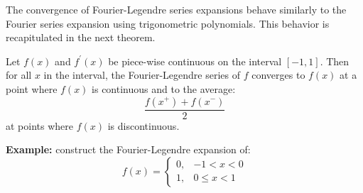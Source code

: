 The convergence of Fourier-Legendre series expansions behave similarly to the Fourier series expansion using trigonometric polynomials.  This behavior is recapitulated in the next theorem. 

\begin{theorem}
Let $f(x)$ and $f^{\prime}(x)$ be piece-wise continuous on the interval $[-1,1]$. Then for all $x$ in the interval, the Fourier-Legendre series of $f$ converges to $f(x)$ at a point where $f(x)$ is continuous and to the average:
\begin{equation*}
\frac{f(x^+) + f(x^-) }{2}
\end{equation*}
at points where $f(x)$ is discontinuous.
\end{theorem}

\vspace{0.5cm}

\noindent\textbf{Example:} construct the Fourier-Legendre expansion of:
\begin{equation*}
f(x) = 
\begin{cases}
0, & -1 < x < 0 \\
1, & 0 \le x < 1
\end{cases}
\end{equation*}

